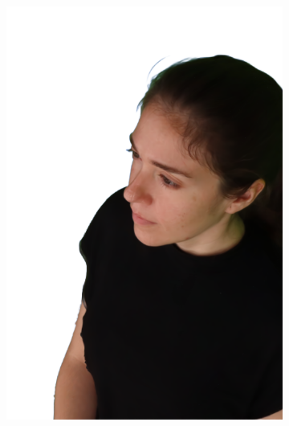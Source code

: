 \begin{figure}[!ht]
\begin{subfigure}{0.12\linewidth}
        \includegraphics[width=\textwidth]{Figures/results/initials/irene/22_render.png}

\end{subfigure}
\end{figure}
